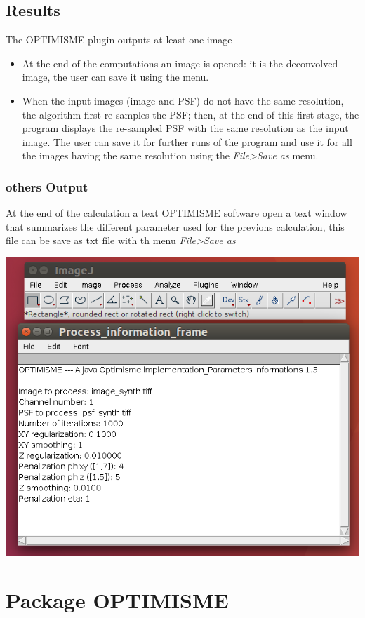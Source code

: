 \documentclass[12pt, a4paper]{scrartcl}
\begin{document}
\subsection{Results}

The OPTIMISME plugin outputs at least one image
\begin{itemize}

\item At the end of the computations an image is opened: it is the deconvolved image, the user can save it using the   menu.
\item When the input images (image and PSF) do not have the same resolution, the algorithm first re-samples the PSF; then, at the end of this first stage, the program displays the re-sampled PSF with the same resolution as the input image. The user can save it for further runs of the program and use it for all the images having the same resolution  using the \emph{File>Save as} menu.
\end{itemize}
\subsubsection{others Output}
At the end of the calculation a text OPTIMISME software open a text window that summarizes the different parameter used for the previons calculation, this file can be save as txt file with th menu \emph{File>Save as}

\includegraphics[scale=0.3]{images/txtWindow.png}
\section{Package OPTIMISME}
\end{document}

